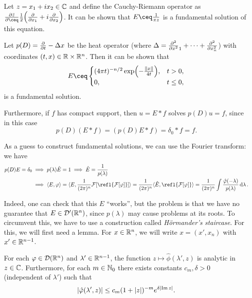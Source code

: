 \begin{example}
	Let $z = x_1 + i x_2 \in \mathbb C$ and define the Cauchy-Riemann operator as $\pdv{\bar z} \ceq \frac12 \qty(\pdv{x_1} + i \pdv{x_2})$. 
	It can be shown that $E \ceq \frac1{\pi z}$ is a fundamental solution of this equation. 
\end{example}

\begin{example}
	Let $p(D) = \pdv{t} - \Delta x$ be the heat operator (where $\Delta = \pdv[2]x_1 + \dotsb + \pdv[2]{x_n}$) with coordinates $(t, x) \in \mathbb R \times \mathbb R^n$. Then it can be shown that
	\[
	E \ceq \begin{cases}
		(4\pi t)^{-n/2} \exp(-\frac{\norm{x}}{4t}), &t > 0, \\ 0, & t \leq 0,
	\end{cases}
	\]
	is a fundamental solution. 
	
	Furthermore, if $f$ has compact support, then $u = E * f$ solves $p(D) u = f$, since in this case
	\[
	p(D)(E * f) = (p(D) E * f) = \delta_0 * f = f. 
	\]
\end{example}

As a guess to construct fundamental solutions, we can use the Fourier transform: we have
\begin{align*}
	p(D) E = \delta_0 &\implies p(\lambda) \hat E = 1 \implies \hat E = \frac{1}{p(\lambda)}  \\
	&\implies \ang{E, \phi} = \ang{E,\frac{1}{(2\pi)^n} \FF[\refl{\FF[\phi]}]} = \frac{1}{(2\pi)^n}\ang{\hat E, \refl{\FF[\phi]}} =\frac{1}{(2\pi)^n} \int \frac{\hat\phi(-\lambda)}{p(\lambda)} \dd{\lambda}. 
\end{align*}

Indeed, one can check that this $E$ ``works'', but the problem is that we have no guarantee that $E \in \mathcal D'(\mathbb R^n)$, since $p(\lambda)$ may cause problems at its roots. To circumvent this, we have to use a construction called \emph{H\"ormander's staircase}.
For this, we will first need a lemma. For $x \in \mathbb R^n$, we will write $x = (x', x_n)$ with $x' \in \mathbb R^{n-1}$. 
\begin{lemma}
	For each $\varphi \in \mathcal D(\mathbb R^n)$ and $\lambda' \in \mathbb R^{n-1}$, the function $z \mapsto \hat\phi(\lambda', z)$ is analytic in $z\in\mathbb C$. Furthermore, for each $m \in \mathbb N_0$ there exists constants $c_m, \delta > 0$ (independent of $\lambda'$) such that
	\[
	\abs{\hat{\varphi}(\lambda', z)} \leq c_m(1 + \abs{z})^{-m} e^{\delta \abs{\Im z}}. 
	\] 
\end{lemma}

